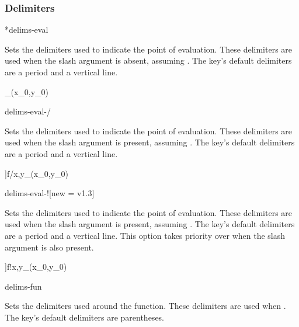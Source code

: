 \subsubsection*{Delimiters}

\begin{option}*{delims-eval}
	\begin{values}[default = .~\cs{rvert}]
	\end{values}
	Sets the delimiters used to indicate the point of evaluation. These delimiters are used when the slash argument is absent, assuming . The key's default delimiters are a period and a vertical line.
	\begin{example}
		_{(x_0,y_0)}
	\end{example}
\end{option}

\begin{option}{delims-eval-/}
	\begin{values}[default = .~\cs{rvert}]
		\meta{right delimiter}
	\end{values}
	Sets the delimiters used to indicate the point of evaluation. These delimiters are used when the slash argument is present, assuming . The key's default delimiters are a period and a vertical line.
	\begin{example}
		\pdv[delims-eval-/=[]]{f}/{x,y}_{(x_0,y_0)}
	\end{example}
\end{option}

\begin{option}{delims-eval-!}[new = v1.3]
	\begin{values}[default = .~\cs{rvert}]
	\end{values}
	Sets the delimiters used to indicate the point of evaluation. These delimiters are used when the slash argument is present, assuming . The key's default delimiters are a period and a vertical line. This option takes priority over  when the slash argument is also present.
	\begin{example}
		\pdv[delims-eval-!=[]]{f}!{x,y}_{(x_0,y_0)}
	\end{example}
\end{option}

\begin{option}{delims-fun}
	\begin{values}[default = (~)]
	\end{values}
	Sets the delimiters used around the function. These delimiters are used when . The key's default delimiters are parentheses.
	\begin{example}
		\pdv[delims-fun=\langle\rangle, fun]{f}{x,y}
	\end{example}
\end{option}

